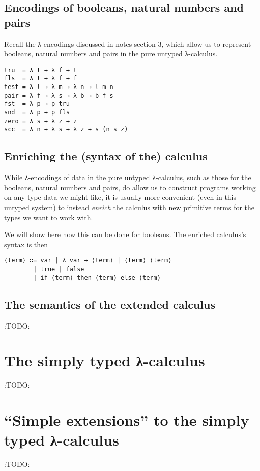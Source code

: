 \documentclass[11pt]{article}
\theoremstyle{definition}
\begin{document}
\subsection{Encodings of booleans, natural numbers and pairs}
\label{sec:orgcfafcb2}

Recall the λ-encodings discussed in notes section 3,
which allow us to represent booleans, natural numbers
and pairs in the pure untyped λ-calculus.
\begin{verbatim}
tru  = λ t → λ f → t
fls  = λ t → λ f → f
test = λ l → λ m → λ n → l m n
pair = λ f → λ s → λ b → b f s
fst  = λ p → p tru
snd  = λ p → p fls
zero = λ s → λ z → z
scc  = λ n → λ s → λ z → s (n s z)
\end{verbatim}

\subsection{Enriching the (syntax of the) calculus}
\label{sec:orgb583b0b}

While λ-encodings of data in the pure untyped λ-calculus,
such as those for the booleans, natural numbers and pairs,
do allow us to construct programs working on any type data
we might like, it is usually more convenient
(even in this untyped system)
to instead \emph{enrich} the calculus with new primitive terms
for the types we want to work with.

We will show here how this can be done for booleans.
The enriched calculus's syntax is then
\begin{verbatim}
⟨term⟩ ∷= var | λ var → ⟨term⟩ | ⟨term⟩ ⟨term⟩
        | true | false
        | if ⟨term⟩ then ⟨term⟩ else ⟨term⟩
\end{verbatim}

\subsection{The semantics of the extended calculus}
\label{sec:orgca45f25}

:TODO:

\section{The simply typed λ-calculus}
\label{sec:org55bb4cc}

:TODO:

\section{“Simple extensions” to the simply typed λ-calculus}
\label{sec:org1d8a0ab}

:TODO:
\end{document}
